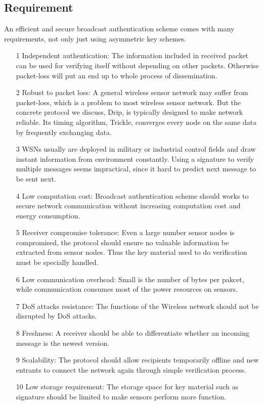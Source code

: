 \documentclass{sig-alternate-05-2015}
\begin{document}
\subsection{Requirement}

An efficient and secure broadcast authentication scheme comes with many requirements, not only just using asymmetric key schemes.

 

\begin{itemize}
\item[1] 
Independent authentication: The information included in received packet can be used for verifying itself without depending on other packets. Otherwise packet-loss will put an end up to whole process of dissemination.

\item[2] Robust to packet loss: A general wireless sensor network may suffer from packet-loss, which is a problem to most wireless sensor network. But the concrete protocol we discuss, Drip, is typically designed to make network reliable. Its timing algorithm, Trickle, converges every node on the same data by frequently exchanging data.

\item[3] WSNs usually are deployed in military or industrial control fields and draw instant information from environment constantly. 
Using a signature to verify multiple messages seems impractical, since it hard to predict next message to be sent next.

\item[4] Low computation cost: Broadcast authentication scheme should works to secure network communication without increasing computation cost and energy consumption. 

\item[5] Receiver compromise tolerance: Even a large number sensor nodes is compromised, the protocol should ensure no valuable information be  extracted from sensor nodes. Thus the key material used to do verification must be specially handled.

\item[6] Low communication overhead: Small is the number of bytes per pakcet, while communication consumes most of the power resources on sensors.

\item[7] DoS attacks resistance: The functions of the Wireless network should not be disrupted by DoS attacks.

\item[8] Freshness: A receiver should be able to differentiate whether an incoming message is the newest version.

\item[9] Scalability: The protocol should allow recipients temporarily offline and new entrants to connect the network again through  simple verification process.

\item[10] Low storage requirement: The storage space for key material such as signature should be limited to make sensors perform more function.
\end{itemize}
\end{document}

